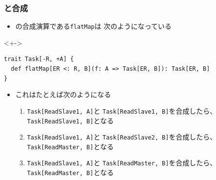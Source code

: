 \begin{frame}[fragile]
  \frametitle{\Fujitask と合成}
 
  \pause
  \begin{itemize}
    \item<+-> \Fujitask の合成演算である\lstinline|flatMap|は
    次のようになっている
  \end{itemize}
    
  \begin{uncoverenv}<+->
\begin{lstlisting}[style=scala]
trait Task[-R, +A] {
  def flatMap[ER <: R, B](f: A => Task[ER, B]): Task[ER, B]
}
\end{lstlisting}
  \end{uncoverenv}
 
  \begin{itemize}
    \item<+-> これはたとえば次のようになる
    \begin{enumerate}
      \item<+-> \lstinline|Task[ReadSlave1, A]|と
      \lstinline|Task[ReadSlave1, B]|を合成したら、\lstinline|Task[ReadSlave1, B]|となる
 
      \item<+-> \lstinline|Task[ReadSlave1, A]|と
      \lstinline|Task[ReadSlave2, B]|を合成したら、\lstinline|Task[ReadMaster, B]|となる
 
      \item<+-> \lstinline|Task[ReadSlave1, A]|と
      \lstinline|Task[ReadMaster, B]|を合成したら、\lstinline|Task[ReadMaster, B]|となる
    \end{enumerate}
  \end{itemize}
\end{frame}

